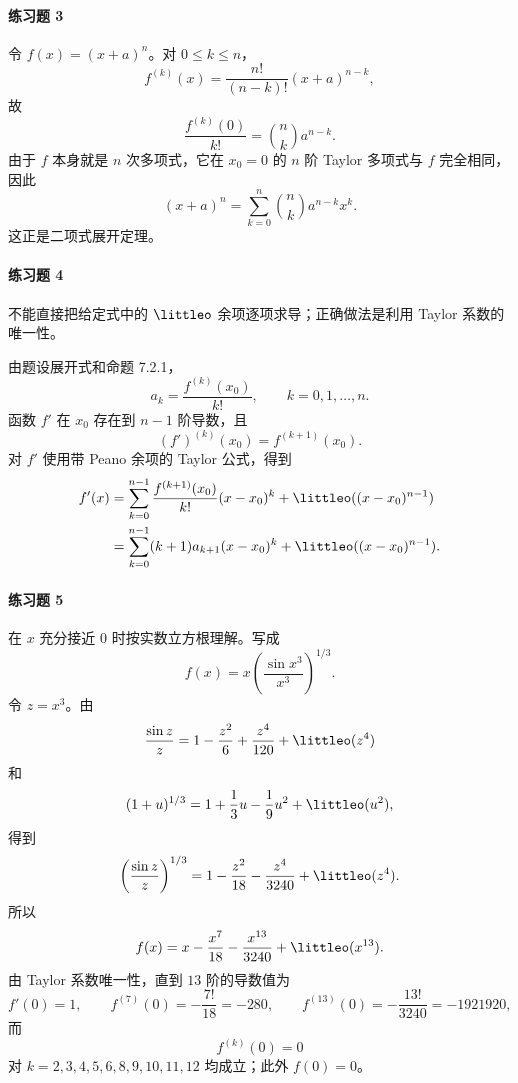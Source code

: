\paragraph{练习题 3}
\begin{xsolution}
令 $f(x)=(x+a)^n$。对 $0\leqslant k\leqslant n$，
\[
  f^{(k)}(x)=\frac{n!}{(n-k)!}(x+a)^{n-k},
\]
故
\[
  \frac{f^{(k)}(0)}{k!}
  =\binom nk a^{n-k}.
\]
由于 $f$ 本身就是 $n$ 次多项式，它在 $x_0=0$ 的 $n$ 阶 Taylor 多项式与 $f$ 完全相同，因此
\[
  (x+a)^n
  =\sum_{k=0}^n\binom nk a^{n-k}x^k.
\]
这正是二项式展开定理。
\end{xsolution}

\paragraph{练习题 4}
\begin{xsolution}
不能直接把给定式中的 $\littleo$ 余项逐项求导；正确做法是利用 Taylor 系数的唯一性。

由题设展开式和命题 7.2.1，
\[
  a_k=\frac{f^{(k)}(x_0)}{k!},
  \qquad k=0,1,\ldots,n.
\]
函数 $f'$ 在 $x_0$ 存在到 $n-1$ 阶导数，且
\[
  (f')^{(k)}(x_0)=f^{(k+1)}(x_0).
\]
对 $f'$ 使用带 Peano 余项的 Taylor 公式，得到
\[
  \begin{aligned}
  f'(x)
  &=\sum_{k=0}^{n-1}\frac{f^{(k+1)}(x_0)}{k!}(x-x_0)^k
    +\littleo((x-x_0)^{n-1})\\
  &=\sum_{k=0}^{n-1}(k+1)a_{k+1}(x-x_0)^k
    +\littleo((x-x_0)^{n-1}).
  \end{aligned}
\]
\end{xsolution}

\paragraph{练习题 5}
\begin{xsolution}
在 $x$ 充分接近 $0$ 时按实数立方根理解。写成
\[
  f(x)=x\left(\frac{\sin x^3}{x^3}\right)^{1/3}.
\]
令 $z=x^3$。由
\[
  \frac{\sin z}{z}=1-\frac{z^2}{6}+\frac{z^4}{120}+\littleo(z^4)
\]
和
\[
  (1+u)^{1/3}=1+\frac13u-\frac19u^2+\littleo(u^2),
\]
得到
\[
  \left(\frac{\sin z}{z}\right)^{1/3}
  =1-\frac{z^2}{18}-\frac{z^4}{3240}+\littleo(z^4).
\]
所以
\[
  f(x)=x-\frac{x^7}{18}-\frac{x^{13}}{3240}+\littleo(x^{13}).
\]
由 Taylor 系数唯一性，直到 $13$ 阶的导数值为
\[
  f'(0)=1,
  \qquad
  f^{(7)}(0)=-\frac{7!}{18}=-280,
  \qquad
  f^{(13)}(0)=-\frac{13!}{3240}=-1921920,
\]
而
\[
  f^{(k)}(0)=0
\]
对 $k=2,3,4,5,6,8,9,10,11,12$ 均成立；此外 $f(0)=0$。
\end{xsolution}

